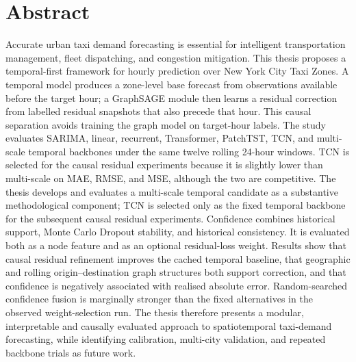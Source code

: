 \documentclass[12pt,a4paper]{report}
\begin{document}
	\chapter*{Abstract}
Accurate urban taxi demand forecasting is essential for intelligent transportation management, fleet dispatching, and congestion mitigation. This thesis proposes a temporal-first framework for hourly prediction over New York City Taxi Zones. A temporal model produces a zone-level base forecast from observations available before the target hour; a GraphSAGE module then learns a residual correction from labelled residual snapshots that also precede that hour. This causal separation avoids training the graph model on target-hour labels. The study evaluates SARIMA, linear, recurrent, Transformer, PatchTST, TCN, and multi-scale temporal backbones under the same twelve rolling 24-hour windows. TCN is selected for the causal residual experiments because it is slightly lower than multi-scale on MAE, RMSE, and MSE, although the two are competitive. The thesis develops and evaluates a multi-scale temporal candidate as a substantive methodological component; TCN is selected only as the fixed temporal backbone for the subsequent causal residual experiments. Confidence combines historical support, Monte Carlo Dropout stability, and historical consistency. It is evaluated both as a node feature and as an optional residual-loss weight. Results show that causal residual refinement improves the cached temporal baseline, that geographic and rolling origin--destination graph structures both support correction, and that confidence is negatively associated with realised absolute error. Random-searched confidence fusion is marginally stronger than the fixed alternatives in the observed weight-selection run. The thesis therefore presents a modular, interpretable and causally evaluated approach to spatiotemporal taxi-demand forecasting, while identifying calibration, multi-city validation, and repeated backbone trials as future work.
	\clearpage
\end{document}
